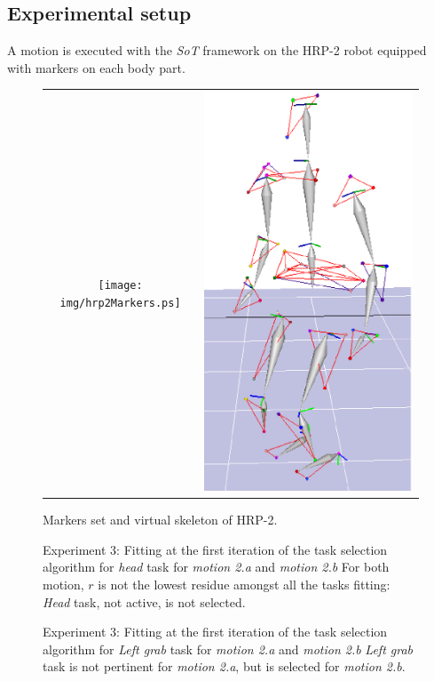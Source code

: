\documentclass[journal]{IEEEtran}
\begin{document}
\subsection{Experimental setup}\label{sec:xpset}
A motion is executed with the \emph{SoT} framework on the HRP-2 robot equipped with markers on each
body part.
\begin{figure}[t]
  \centering
  \begin{tabular}{cc}
    \texttt{[image: img/hrp2Markers.ps]} &
    \includegraphics[height=0.4\linewidth]{img/skel.ps} \\
  \end{tabular}
  \caption{Markers set and virtual skeleton of HRP-2.}
  \label{fig:hrp2Markers}
\end{figure}
\begin{figure}[hp]
  \centering
  \subfigure[Motion 2.a]{
  \resizebox{.46\textwidth}{!} {
  
  }
  \label{fig:exp1:headFit:R}
  }
  \subfigure[Motion 2.b]{
  \resizebox{.46\textwidth}{!} {
  
  }
  \label{fig:exp1:headFit:RL}
  }
  \caption{Experiment 3: Fitting at the first iteration of the task selection algorithm
  for \emph{head} task for \emph{motion 2.a} and \emph{motion 2.b}
  For both motion, $r$ is not the lowest residue amongst all the tasks fitting: \emph{Head} task, not active, is not selected.}
  \label{fig:exp1:headFit}
\end{figure}
\begin{figure}[hp]
  \centering
  \subfigure[Motion 2.a]{
  \resizebox{.46\textwidth}{!} {
  
  }
  \label{fig:exp1:taskLhand:R}
  }
  \subfigure[Motion 2.b]{
  \resizebox{.46\textwidth}{!} {
  
  }
  \label{fig:exp1:taskLhand:RL}
  }
  \caption{Experiment 3: Fitting at the first iteration of the task selection algorithm
  for \emph{Left grab} task for \emph{motion 2.a} and \emph{motion 2.b}
  \emph{Left grab} task is not pertinent for \emph{motion 2.a}, but is selected for \emph{motion 2.b}.}
  \label{fig:exp1:taskLhand}
\end{figure}
\end{document}
